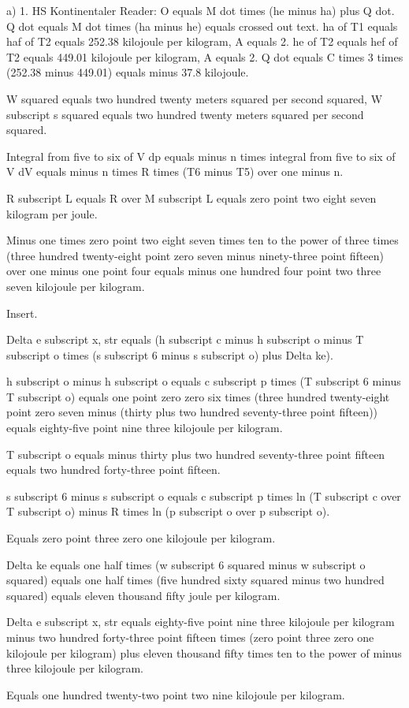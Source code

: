 a) 1. HS Kontinentaler Reader:
O equals M dot times (he minus ha) plus Q dot.
Q dot equals M dot times (ha minus he) equals crossed out text.
ha of T1 equals haf of T2 equals 252.38 kilojoule per kilogram, A equals 2.
he of T2 equals hef of T2 equals 449.01 kilojoule per kilogram, A equals 2.
Q dot equals C times 3 times (252.38 minus 449.01) equals minus 37.8 kilojoule.

W squared equals two hundred twenty meters squared per second squared, W subscript s squared equals two hundred twenty meters squared per second squared.

Integral from five to six of V dp equals minus n times integral from five to six of V dV equals minus n times R times (T6 minus T5) over one minus n.

R subscript L equals R over M subscript L equals zero point two eight seven kilogram per joule.

Minus one times zero point two eight seven times ten to the power of three times (three hundred twenty-eight point zero seven minus ninety-three point fifteen) over one minus one point four equals minus one hundred four point two three seven kilojoule per kilogram.

Insert.

Delta e subscript x, str equals (h subscript c minus h subscript o minus T subscript o times (s subscript 6 minus s subscript o) plus Delta ke).

h subscript o minus h subscript o equals c subscript p times (T subscript 6 minus T subscript o) equals one point zero zero six times (three hundred twenty-eight point zero seven minus (thirty plus two hundred seventy-three point fifteen)) equals eighty-five point nine three kilojoule per kilogram.

T subscript o equals minus thirty plus two hundred seventy-three point fifteen equals two hundred forty-three point fifteen.

s subscript 6 minus s subscript o equals c subscript p times ln (T subscript c over T subscript o) minus R times ln (p subscript o over p subscript o).

Equals zero point three zero one kilojoule per kilogram.

Delta ke equals one half times (w subscript 6 squared minus w subscript o squared) equals one half times (five hundred sixty squared minus two hundred squared) equals eleven thousand fifty joule per kilogram.

Delta e subscript x, str equals eighty-five point nine three kilojoule per kilogram minus two hundred forty-three point fifteen times (zero point three zero one kilojoule per kilogram) plus eleven thousand fifty times ten to the power of minus three kilojoule per kilogram.

Equals one hundred twenty-two point two nine kilojoule per kilogram.